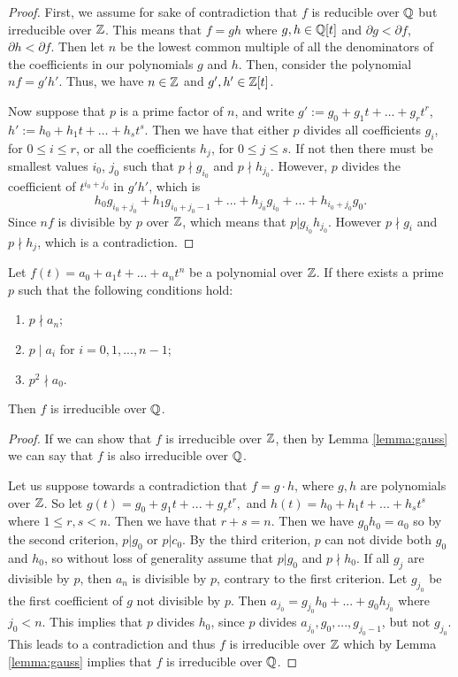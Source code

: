 \begin{proof}

First, we assume for sake of contradiction that $f$ is reducible over $\mathbb Q$ but irreducible over $\mathbb Z$. This means that $f=gh$ where $g,h \in \mathbb Q[t]$ and $\partial g < \partial f$, $\partial h < \partial f$. Then let $n$ be the lowest common multiple of all the denominators of the coefficients in our polynomials $g$ and $h$. Then, consider the polynomial $nf = g' h'$. Thus, we have $n \in \mathbb Z$ and $g', h' \in \mathbb Z[t]$. 

Now suppose that $p$ is a prime factor of $n$, and write $g' := g_0 + g_1 t +\dots+ g_r t^r$, $h' := h_0 + h_1 t +\dots+ h_s t^s$. Then we have that either $p$ divides all coefficients $g_i$, for $0\leq i\leq r$, or all the coefficients $h_j$, for $0\leq j \leq s$. If not then there must be smallest values $i_0$, $j_0$ such that $p \nmid g_{i_0}$ and $p \nmid h_{j_0}$. However, $p$ divides the coefficient of $t^{i_0+j_0}$ in $g' h'$, which is
$$
h_0 g_{i_0+j_0} + h_1 g_{i_0+j_0-1} +...+ h_{j_0} g_{i_0} +...+ h_{i_0+j_0} g_0.
$$
Since $nf$ is divisible by $p$ over $\mathbb Z$, which means that $p |g_{i_0} h_{j_0}$. However $p \nmid g_i$ and $p \nmid h_j$, which is a contradiction.
\end{proof}

\begin{theorem} \label{thm:eisenstein}
    Let
    $f(t) = a_0 + a_1 t + ... + a_n t^n$
    be a polynomial over $\mathbb Z$. 
    If there exists a prime $p$ such that the following conditions hold:
    \begin{enumerate}[label=(\roman*)]
        \item $p \nmid a_n$;
        \item $p \mid a_i$ for $i = {0, 1,..., n-1}$;
        \item $p^2 \nmid a_0$. 
    \end{enumerate}
    Then $f$ is irreducible over $\mathbb Q$. 
\end{theorem}

\begin{proof}
If we can show that $f$ is irreducible over $\mathbb Z$, then by Lemma \ref{lemma:gauss} we can say that $f$ is also irreducible over $\mathbb Q$.

Let us suppose towards a contradiction that $f=g \cdot h$, where $g,h$ are polynomials over $\mathbb Z$. So let $g(t)=g_0+g_1 t+ ... +g_r t^r,$ and $h(t)=h_0+h_1t+ ... +h_st^s$ where $1 \leq r, s < n$. Then we have that $r+s=n$. Then we have $g_0 h_0 = a_0$ so by the second criterion, $p|g_0$ or $p|c_0$. By the third criterion, $p$ can not divide both $g_0$ and $h_0$, so without loss of generality assume that $p | g_0$ and $p \nmid h_0$. If all $g_j$ are divisible by $p$, then $a_n$ is divisible by $p$, contrary to the first criterion. Let $g_{j_0}$ be the first coefficient of $g$ not divisible by $p$. Then
$
a_{j_0} = g_{j_0} h_0 + ...+ g_0 h_{j_0}
$
where $j_0 < n$. This implies that $p$ divides $h_0$, since $p$ divides $a_{j_0}, g_0,..., g_{j_0-1}$, but not $g_{j_0}$. This leads to a contradiction and thus $f$ is irreducible over $\mathbb Z$ which by Lemma \ref{lemma:gauss} implies that $f$ is irreducible over $\mathbb Q$.
\end{proof}

